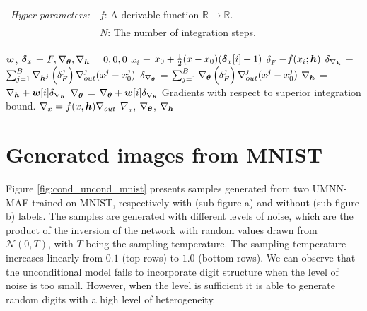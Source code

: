 \begin{algorithm}[H]
\begin{tabular}{ll}
     \textit{Hyper-parameters:} & $f$: A derivable function $\mathbb{R}\rightarrow \mathbb{R}$.\\
     &$N$: The number of integration steps.
\end{tabular}
\small
\begin{algorithmic}[1]
\State $\boldsymbol{w}$, $\boldsymbol{\delta}_x$ =  
\State $F, \nabla_{\boldsymbol{\theta}}, \nabla_{\boldsymbol{h}} = 0, 0, 0$
\State $x_i$ = $x_0 + \frac{1}{2} (x - x_0)(\boldsymbol{\delta}_x[i] + 1)$
\State $\delta_F$ =$f(x_i; \boldsymbol{h})$
\State $\delta_{\nabla_{\boldsymbol{h}}}$ = $ \sum_{j=1}^{B} \nabla_{{\boldsymbol{h}}^j}\left(\delta_F^j\right) \nabla_{out}^j (x^j-x_0^j)$
\State $\delta_{\nabla_{\boldsymbol{\theta}}}$ = $ \sum_{j=1}^{B} \nabla_{\boldsymbol{\theta}}\left(\delta_F^j\right) \nabla_{out}^j (x^j-x_0^j)$
\State $\nabla_{\boldsymbol{h}}$ = $\nabla_{\boldsymbol{h}} + \boldsymbol{w}[i] \delta_{\nabla_{\boldsymbol{h}}}$
\State $\nabla_{\boldsymbol{\theta}}$ = $\nabla_{\boldsymbol{\theta}} + \boldsymbol{w}[i] \delta_{\nabla_{\boldsymbol{\theta}}}$
\EndFor
\LineComment Gradients with respect to superior integration bound.
\State $\nabla_x = f(x, \boldsymbol{h}) \nabla_{out}$
\State \Return $\nabla_x$, $\nabla_{\boldsymbol{\theta}}$, $\nabla_{\boldsymbol{h}}$
\EndProcedure
\end{algorithmic}
\vspace{1em}
\endgroup
\end{algorithm}

\section{Generated images from MNIST}\label{app:supp_results}
Figure \ref{fig:cond_uncond_mnist} presents samples generated from two UMNN-MAF trained on MNIST, respectively with (sub-figure a) and without (sub-figure b) labels. The samples are generated with different levels of noise, which are the product of the inversion of the network with random values drawn from $\mathcal{N}(0, T)$, with $T$ being the sampling temperature. The sampling temperature increases linearly from $0.1$ (top rows) to $1.0$ (bottom rows). We can observe that the unconditional model fails to incorporate digit structure when the level of noise is too small. However, when the level is sufficient it is able to generate random digits with a high level of heterogeneity.

